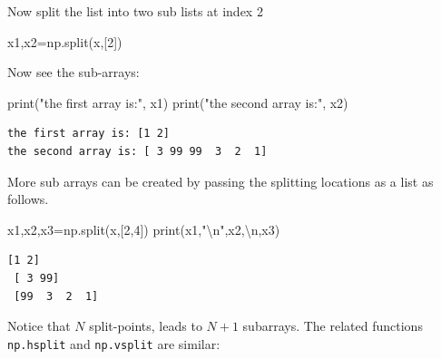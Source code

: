 \documentclass[
  letterpaper,
  DIV=11,
  numbers=noendperiod]{scrreprt}
\newenvironment{Shaded}{\begin{snugshade}}{\end{snugshade}}
\newcommand{\BuiltInTok}[1]{\textcolor[rgb]{0.00,0.23,0.31}{#1}}
\newcommand{\CharTok}[1]{\textcolor[rgb]{0.13,0.47,0.30}{#1}}
\newcommand{\DecValTok}[1]{\textcolor[rgb]{0.68,0.00,0.00}{#1}}
\newcommand{\NormalTok}[1]{\textcolor[rgb]{0.00,0.23,0.31}{#1}}
\newcommand{\OperatorTok}[1]{\textcolor[rgb]{0.37,0.37,0.37}{#1}}
\newcommand{\StringTok}[1]{\textcolor[rgb]{0.13,0.47,0.30}{#1}}
\theoremstyle{plain}
\theoremstyle{definition}
\theoremstyle{remark}
\begin{document}
Now split the list into two sub lists at index 2

\begin{Shaded}
\begin{Highlighting}[]
\NormalTok{x1,x2}\OperatorTok{=}\NormalTok{np.split(x,[}\DecValTok{2}\NormalTok{])}
\end{Highlighting}
\end{Shaded}

Now see the sub-arrays:

\begin{Shaded}
\begin{Highlighting}[]
\BuiltInTok{print}\NormalTok{(}\StringTok{"the first array is:"}\NormalTok{, x1)}
\BuiltInTok{print}\NormalTok{(}\StringTok{"the second array is:"}\NormalTok{, x2)}
\end{Highlighting}
\end{Shaded}

\begin{verbatim}
the first array is: [1 2]
the second array is: [ 3 99 99  3  2  1]
\end{verbatim}

More sub arrays can be created by passing the splitting locations as a
list as follows.

\begin{Shaded}
\begin{Highlighting}[]
\NormalTok{x1,x2,x3}\OperatorTok{=}\NormalTok{np.split(x,[}\DecValTok{2}\NormalTok{,}\DecValTok{4}\NormalTok{])}
\BuiltInTok{print}\NormalTok{(x1,}\StringTok{"}\CharTok{\textbackslash{}n}\StringTok{"}\NormalTok{,x2,}\StringTok{\textquotesingle{}}\CharTok{\textbackslash{}n}\StringTok{\textquotesingle{}}\NormalTok{,x3)}
\end{Highlighting}
\end{Shaded}

\begin{verbatim}
[1 2] 
 [ 3 99] 
 [99  3  2  1]
\end{verbatim}

\begin{tcolorbox}[enhanced jigsaw, leftrule=.75mm, bottomtitle=1mm, colback=white, toptitle=1mm, opacitybacktitle=0.6, toprule=.15mm, colbacktitle=quarto-callout-note-color!10!white, arc=.35mm, colframe=quarto-callout-note-color-frame, title=\textcolor{quarto-callout-note-color}{\faInfo}\hspace{0.5em}{Note}, titlerule=0mm, rightrule=.15mm, left=2mm, bottomrule=.15mm, breakable, coltitle=black, opacityback=0]

Notice that \(N\) split-points, leads to \(N + 1\) subarrays. The
related functions \texttt{np.hsplit} and \texttt{np.vsplit} are similar:

\end{tcolorbox}
\end{document}
